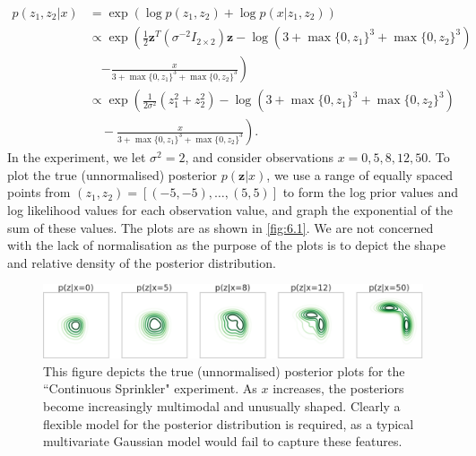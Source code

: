 \documentclass[honours,12pt]{unswthesis}
\numberwithin{equation}{section}
\theoremstyle{definition}
\begin{document}
\begin{equation}
\begin{aligned}
p(z_1,z_2|x)&= \exp(\log p(z_1,z_2)+\log p(x|z_1,z_2))\\
&\propto\exp\left(\frac12\bm{z}^T(\sigma^{-2}I_{2\times 2})\bm{z}-\log (3+\max\{0,z_1\}^3+\max\{0,z_2\}^3)\right.\\
&\quad\left.-\frac{x}{3+\max\{0,z_1\}^3+\max\{0,z_2\}^3}\right)\\
&\propto \exp\left(\frac{1}{2\sigma^2}(z_1^2+z_2^2)-\log (3+\max\{0,z_1\}^3+\max\{0,z_2\}^3)\right.\\
&\left.\quad-\frac{x}{3+\max\{0,z_1\}^3+\max\{0,z_2\}^3}\right).
\end{aligned}
\end{equation}
In the experiment, we let $\sigma^2=2$, and consider observations $x=0,5,8,12,50$. To plot the true (unnormalised) posterior $p(\bm{z}|x)$, we use a range of equally spaced points from $(z_1,z_2)=[(-5,-5),\dots, (5,5)]$ to form the log prior values and log likelihood values for each observation value, and graph the exponential of the sum of these values. The plots are as shown in \autoref{fig:6.1}. We are not concerned with the lack of normalisation as the purpose of the plots is to depict the shape and relative density of the posterior distribution.\\
\begin{figure}[h]
\includegraphics[width=\textwidth]{sprinklertrue.png}
\caption{\small This figure depicts the true (unnormalised) posterior plots for the ``Continuous Sprinkler" experiment. As $x$ increases, the posteriors become increasingly multimodal and unusually shaped. Clearly a flexible model for the posterior distribution is required, as a typical multivariate Gaussian model would fail to capture these features.}
\label{fig:6.1}
\end{figure}
\end{document}
